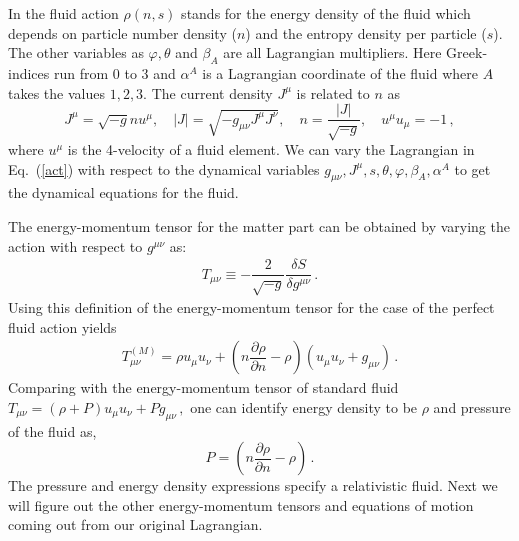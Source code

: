 \documentclass[a4paper,12pt]{article}
\newcommand{\m}{\ensuremath{{\mu \nu}}}
\newcommand{\p}{\ensuremath{\partial{}}}
\begin{document}
In the fluid action $\rho(n,s)$ stands for the energy density of the fluid which depends on particle number density ($n$) and the entropy density  per particle ($s$). The other variables as $\varphi, \theta$ and $\beta_A$ are all Lagrangian multipliers. Here Greek-indices run from $0$ to $3$ and $\alpha^A$ is a Lagrangian coordinate of the fluid where $A$ takes the values $1,2,3$. The current density $J^{\mu}$ is related to $n$ as 
\begin{equation}\label{}
J^\mu = \sqrt{-g}nu^\mu ,  \quad |J|=\sqrt{-g_{\mu\nu}J^\mu J^\nu}, \quad n=\frac{|J|}{\sqrt{-g}}, \quad u^\mu u_\mu=-1\,,
\end{equation}
where $u^{\mu}$ is the 4-velocity of a fluid element. We can vary the Lagrangian in Eq.~(\ref{act}) with respect to the dynamical variables $g_{\m}, J^{\mu},s, \theta,\varphi, \beta_{A}, \alpha^{A}$ to get the dynamical equations for the fluid.
	
The energy-momentum tensor for the matter part can be obtained by varying the action with respect to $g^{\m}$ as:
\begin{eqnarray}
T_{\mu \nu} \equiv -\dfrac{2}{\sqrt{-g}}\dfrac{\delta S}{\delta g^{\mu \nu}}\,.
\label{gentmn}
\end{eqnarray}
Using this definition of the energy-momentum tensor for the case of the perfect fluid action yields 
\begin{eqnarray}
T_{\mu \nu}^{(M)}= \rho u_{\mu } u_{\nu} + \left(n \dfrac{\p \rho}{\p n} -\rho  \right) (u_{\mu } u_{\nu} + g_{\m})\,.
\end{eqnarray}
Comparing with the energy-momentum tensor of standard fluid $T_{\mu \nu}=(\rho + P)u_\mu u_\nu + Pg_{\mu \nu}\,,$ one can identify energy density to be $\rho$ and pressure of the fluid as,
\begin{equation}\label{relativistic fluid pressure}
P= \left(n \dfrac{\p \rho}{\p n} -\rho  \right) \,.
\end{equation}
The pressure and energy density expressions specify a relativistic fluid. Next we will figure out the other energy-momentum tensors and equations of motion coming out from our original Lagrangian.
\end{document}
